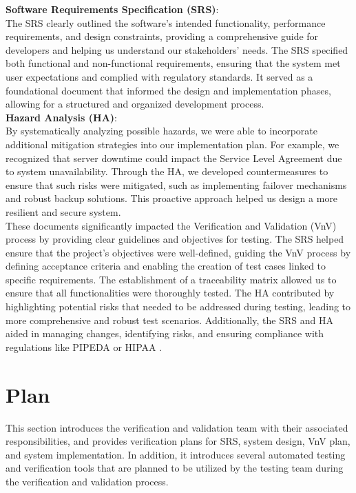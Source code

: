 \documentclass[12pt, titlepage]{article}
\begin{document}
\noindent \textbf{Software Requirements Specification (SRS)}:\\

\noindent The SRS clearly outlined the software’s intended functionality, performance requirements, and design constraints, providing a comprehensive guide for developers and helping us understand our stakeholders' needs. The SRS specified both functional and non-functional requirements, ensuring that the system met user expectations and complied with regulatory standards. It served as a foundational document that informed the design and implementation phases, allowing for a structured and organized development process.\\

\noindent \textbf{Hazard Analysis (HA)}:\\

\noindent  By systematically analyzing possible hazards, we were able to incorporate additional mitigation strategies into our implementation plan. For example, we recognized that server downtime could impact the Service Level Agreement due to system unavailability. Through the HA, we developed countermeasures to ensure that such risks were mitigated, such as implementing failover mechanisms and robust backup solutions. This proactive approach helped us design a more resilient and secure system.\\


\noindent These documents significantly impacted the Verification and Validation (VnV) process by providing clear guidelines and objectives for testing. The SRS helped ensure that the project’s objectives were well-defined, guiding the VnV process by defining acceptance criteria and enabling the creation of test cases linked to specific requirements. The establishment of a traceability matrix allowed us to ensure that all functionalities were thoroughly tested. The HA contributed by highlighting potential risks that needed to be addressed during testing, leading to more comprehensive and robust test scenarios. Additionally, the SRS and HA aided in managing changes, identifying risks, and ensuring compliance with regulations like PIPEDA or HIPAA \citep{HIPAA}.

\section{Plan}

This section introduces the verification and validation team with their associated
 responsibilities, and provides verification plans for SRS, system design, VnV plan,
 and system implementation. In addition, it introduces several automated testing
 and verification tools that are planned to be utilized by the testing team during the
 verification and validation process.
\end{document}
